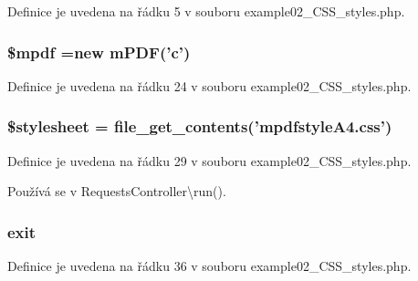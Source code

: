 Definice je uvedena na řádku 5 v souboru example02\-\_\-\-C\-S\-S\-\_\-styles.\-php.

\hypertarget{example02___c_s_s__styles_8php_ad028f81910d6cbab9b184d2214b3a8f8}{
\subsubsection[{\$mpdf}]{\setlength{\rightskip}{0pt plus 5cm}\$mpdf =new {\bf m\-P\-D\-F}('c')}}\label{example02___c_s_s__styles_8php_ad028f81910d6cbab9b184d2214b3a8f8}


Definice je uvedena na řádku 24 v souboru example02\-\_\-\-C\-S\-S\-\_\-styles.\-php.

\hypertarget{example02___c_s_s__styles_8php_a19e5cf73e817c55a49205e6ec78c88a8}{
\subsubsection[{\$stylesheet}]{\setlength{\rightskip}{0pt plus 5cm}\$stylesheet = file\-\_\-get\-\_\-contents('mpdfstyle\-A4.\-css')}}\label{example02___c_s_s__styles_8php_a19e5cf73e817c55a49205e6ec78c88a8}


Definice je uvedena na řádku 29 v souboru example02\-\_\-\-C\-S\-S\-\_\-styles.\-php.



Používá se v Requests\-Controller\textbackslash{}run().

\hypertarget{example02___c_s_s__styles_8php_a6733eb5f605d09eaede9845835d71c4e}{
\subsubsection[{exit}]{\setlength{\rightskip}{0pt plus 5cm}exit}}\label{example02___c_s_s__styles_8php_a6733eb5f605d09eaede9845835d71c4e}


Definice je uvedena na řádku 36 v souboru example02\-\_\-\-C\-S\-S\-\_\-styles.\-php.


